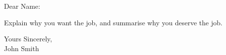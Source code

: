 \documentclass[a4paper,english]{friggeri-letter}
\begin{document}

\address{ 
   123 Fake St \\
   Australia
}




\opening{Dear Name:} 

Explain why you want the job, and summarise why you deserve the job.

\closing{
   Yours Sincerely,\\
   John Smith} 
\end{document}
